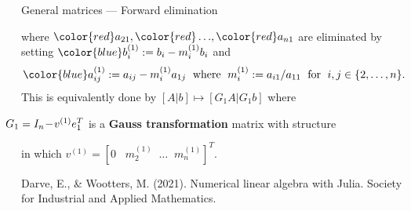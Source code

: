 \documentclass[t,usepdftitle=false]{beamer}
\begin{document}
\begin{frame}{General matrices --- Forward elimination}
\begin{itemize}
where ${\color{red}a_{21}},{\color{red}\dots},{\color{red}a_{n1}}$ are eliminated by setting ${\color{blue}b_{i}^{(1)}}:=b_i-m^{(1)}_{i}b_i$ and
\begin{align*}
\hspace{-.3cm}
{\color{blue}a_{ij}^{(1)}}
:=a_{ij}-m^{(1)}_{i}a_{1j}
\;\text{ where }\;
m^{(1)}_{i} := a_{i1}/a_{11}
\;\text{ for }\;
i,j\in\{2,\dots,n\}.
\end{align*}
This is equivalently done by $[A|b]\mapsto[G_1A|G_1b]$ where
\begin{center}
$\hspace{-.5cm}G_1=I_n\!-\!v^{(1)}e_1^T$
is a \textbf{Gauss transformation} matrix with structure
\vspace{-.15cm}
\end{center}
in which $\displaystyle v^{(1)}=[0\;\;\;m^{(1)}_{2}\;\;\dots\;\;m^{(1)}_{n}]^T$.\vspace{.15cm}
\end{itemize}
\tiny{Darve, E., \& Wootters, M. (2021). Numerical linear algebra with Julia. Society for Industrial and Applied Mathematics.}
\end{frame}
\end{document}

